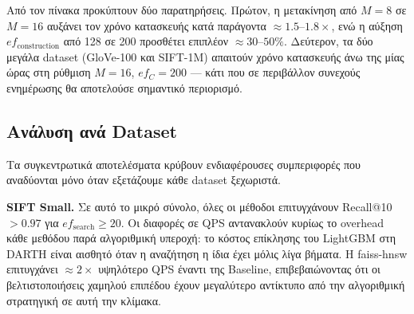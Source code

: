 \documentclass[12pt,a4paper]{article}
\begin{document}
\begin{table}[H]
\centering
\caption{Χρόνοι κατασκευής index (sec), Baseline-HNSW}
\label{tab:build_times}
\end{table}

Από τον πίνακα προκύπτουν δύο παρατηρήσεις. Πρώτον, η μετακίνηση από $M=8$ σε $M=16$ αυξάνει τον χρόνο κατασκευής κατά παράγοντα $\approx 1.5\text{--}1.8\times$, ενώ η αύξηση $ef_{\text{construction}}$ από 128 σε 200 προσθέτει επιπλέον $\approx 30\text{--}50\%$. Δεύτερον, τα δύο μεγάλα dataset (GloVe-100 και SIFT-1M) απαιτούν χρόνο κατασκευής άνω της μίας ώρας στη ρύθμιση $M=16$, $ef_C=200$ --- κάτι που σε περιβάλλον συνεχούς ενημέρωσης θα αποτελούσε σημαντικό περιορισμό.

\subsection{Ανάλυση ανά Dataset}

Τα συγκεντρωτικά αποτελέσματα κρύβουν ενδιαφέρουσες συμπεριφορές που αναδύονται μόνο όταν εξετάζουμε κάθε dataset ξεχωριστά.

\textbf{SIFT Small.} Σε αυτό το μικρό σύνολο, όλες οι μέθοδοι επιτυγχάνουν Recall@10 $> 0.97$ για $ef_{\text{search}} \geq 20$. Οι διαφορές σε QPS αντανακλούν κυρίως το overhead κάθε μεθόδου παρά αλγοριθμική υπεροχή: το κόστος επίκλησης του LightGBM στη DARTH είναι αισθητό όταν η αναζήτηση η ίδια έχει μόλις λίγα βήματα. Η faiss-hnsw επιτυγχάνει $\approx 2\times$ υψηλότερο QPS έναντι της Baseline, επιβεβαιώνοντας ότι οι βελτιστοποιήσεις χαμηλού επιπέδου έχουν μεγαλύτερο αντίκτυπο από την αλγοριθμική στρατηγική σε αυτή την κλίμακα.
\end{document}
